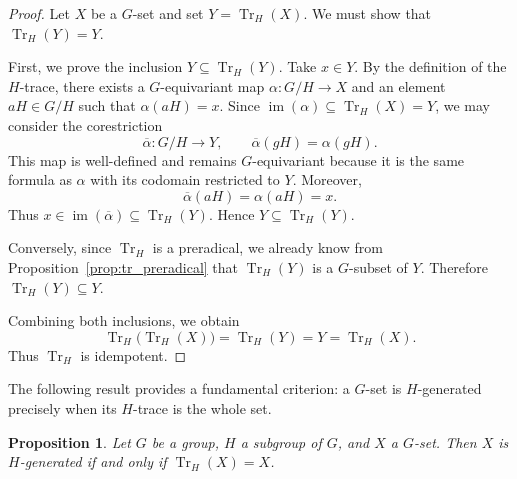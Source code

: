 \documentclass[10pt,a4paper]{amsart}
\newtheorem{proposition}{Proposition}
\begin{document}
\begin{proof}
Let $X$ be a $G$-set and set $Y = \operatorname{Tr}_H(X)$. We must show that $\operatorname{Tr}_H(Y) = Y$.

First, we prove the inclusion $Y \subseteq \operatorname{Tr}_H(Y)$. Take $x \in Y$. By the definition of the $H$-trace, there exists a $G$-equivariant map $\alpha \colon G/H \longrightarrow X$ and an element $aH \in G/H$ such that $\alpha(aH) = x$. Since $\operatorname{im}(\alpha) \subseteq \operatorname{Tr}_H(X) = Y$, we may consider the corestriction
\[
\overline{\alpha} \colon G/H \longrightarrow Y, \qquad \overline{\alpha}(gH) = \alpha(gH).
\]
This map is well-defined and remains $G$-equivariant because it is the same formula as $\alpha$ with its codomain restricted to $Y$. Moreover,
\[
\overline{\alpha}(aH) = \alpha(aH) = x.
\]
Thus $x \in \operatorname{im}(\overline{\alpha}) \subseteq \operatorname{Tr}_H(Y)$. Hence $Y \subseteq \operatorname{Tr}_H(Y)$.

Conversely, since $\operatorname{Tr}_H$ is a preradical, we already know from Proposition~\ref{prop:tr_preradical} that $\operatorname{Tr}_H(Y)$ is a $G$-subset of $Y$. Therefore $\operatorname{Tr}_H(Y) \subseteq Y$.

Combining both inclusions, we obtain
\[
\operatorname{Tr}_H\bigl(\operatorname{Tr}_H(X)\bigr) = \operatorname{Tr}_H(Y) = Y = \operatorname{Tr}_H(X).
\]
Thus $\operatorname{Tr}_H$ is idempotent.
\end{proof}

The following result provides a fundamental criterion: a $G$-set is $H$-generated precisely when its $H$-trace is the whole set.

\begin{proposition}\label{prop:H_generated_trace_criterion}
Let $G$ be a group, $H$ a subgroup of $G$, and $X$ a $G$-set. Then $X$ is $H$-generated if and only if $\operatorname{Tr}_H(X) = X$.
\end{proposition}
\end{document}
